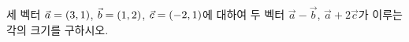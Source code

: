 세 벡터 $\vec{a}=(3{,}\mkern3mu\mathopen{}1)$, $\vec{b}=(1{,}\mkern3mu\mathopen{}2)$, $\vec{c}=(-2{,}\mkern3mu\mathopen{}1)$에 대하여 두 벡터 $\vec{a}-\vec{b}$, $\vec{a}+2\vec{c}$가 이루는 각의 크기를 구하시오.

